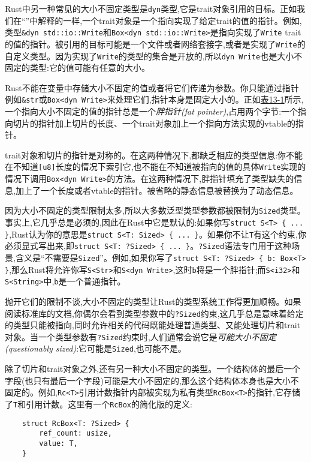 Rust中另一种常见的大小不固定类型是\texttt{dyn}类型,它是trait对象引用的目标。正如我们在“”中解释的一样,一个trait对象是一个指向实现了给定trait的值的指针。例如,类型\texttt{\&dyn std::io::Write}和\texttt{Box<dyn std::io::Write>}是指向实现了\texttt{Write} trait的值的指针。被引用的目标可能是一个文件或者网络套接字,或者是实现了\texttt{Write}的自定义类型。因为实现了\texttt{Write}的类型的集合是开放的,所以\texttt{dyn Write}也是大小不固定的类型:它的值可能有任意的大小。

Rust不能在变量中存储大小不固定的值或者将它们传递为参数。你只能通过指针例如\texttt{\&str}或\texttt{Box<dyn Write>}来处理它们,指针本身是固定大小的。正如\hyperref[f13-1]{表13-1}所示,一个指向大小不固定的值的指针总是一个\emph{胖指针(fat pointer)},占用两个字节:一个指向切片的指针加上切片的长度、一个trait对象加上一个指向方法实现的vtable的指针。

trait对象和切片的指针是对称的。在这两种情况下,都缺乏相应的类型信息:你不能在不知道\texttt{[u8]}长度的情况下索引它,也不能在不知道被指向的值的具体\texttt{Write}实现的情况下调用\texttt{Box<dyn Write>}的方法。在这两种情况下,胖指针填充了类型缺失的信息,加上了一个长度或者vtable的指针。被省略的静态信息被替换为了动态信息。

因为大小不固定的类型限制太多,所以大多数泛型类型参数都被限制为\texttt{Sized}类型。事实上,它几乎总是必须的,因此在Rust中它是默认的:如果你写\texttt{struct S<T> \{ ... \}},Rust认为你的意思是\texttt{struct S<T: Sized> \{ ... \}}。如果你不让\texttt{T}有这个约束,你必须显式写出来,即\texttt{struct S<T: ?Sized> \{ ... \}}。\texttt{?Sized}语法专门用于这种场景,含义是“不需要是\texttt{Sized}”。例如,如果你写了\texttt{struct S<T: ?Sized> \{ b: Box<T> \}},那么Rust将允许你写\texttt{S<Str>}和\texttt{S<dyn Write>},这时\texttt{b}将是一个胖指针;而\texttt{S<i32>}和\texttt{S<String>}中,\texttt{b}是一个普通指针。

抛开它们的限制不谈,大小不固定的类型让Rust的类型系统工作得更加顺畅。如果阅读标准库的文档,你偶尔会看到类型参数中的\texttt{?Sized}约束,这几乎总是意味着给定的类型只能被指向,同时允许相关的代码既能处理普通类型、又能处理切片和trait对象。当一个类型参数有\texttt{?Sized}约束时,人们通常会说它是\emph{可能大小不固定(questionably sized)}:它可能是\texttt{Sized},也可能不是。

除了切片和trait对象之外,还有另一种大小不固定的类型。一个结构体的最后一个字段(也只有最后一个字段)可能是大小不固定的,那么这个结构体本身也是大小不固定的。例如,\texttt{Rc<T>}引用计数指针内部被实现为私有类型\texttt{RcBox<T>}的指针,它存储了\texttt{T}和引用计数。这里有一个\texttt{RcBox}的简化版的定义:
\begin{verbatim}
    struct RcBox<T: ?Sized> {
        ref_count: usize,
        value: T,
    }
\end{verbatim}

